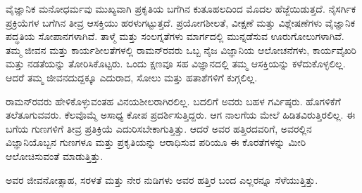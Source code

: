 ವೈಜ್ಞಾನಿಕ ಮನೋಧರ್ಮವು ಮುಖ್ಯವಾಗಿ ಪ್ರಕೃತಿಯ ಬಗೆಗಿನ ಕುತೂಹಲದಿಂದ ಮೊದಲ ಹೆಜ್ಜೆಯಿಡುತ್ತದೆ. ನೈಸರ್ಗಿಕ ಪ್ರಕ್ರಿಯೆಗಳ ಬಗೆಗಿನ ತೀವ್ರ ಆಸಕ್ತಿಯು ಹರಳುಗಟ್ಟುತ್ತದೆ. ಪ್ರಯೋಗ\-ಶೀಲತೆ, ವೀಕ್ಷಣೆ ಮತ್ತು ವಿಶ್ಲೇಷಣೆಗಳು ವೈಜ್ಞಾನಿಕ ಪದ್ಧತಿಯ ಸೋಪಾನಗಳಾಗಿವೆ. ತಾಳ್ಮೆ ಮತ್ತು ಸಂಲಗ್ನತೆಗಳು ಮಾರ್ಗದಲ್ಲಿ ಮುನ್ನಡೆಸುವ ಊರುಗೋಲುಗಳಾಗಿವೆ. ತಮ್ಮ ಜೀವನ ಮತ್ತು ಕಾರ್ಯಶೀಲತೆಗಳಲ್ಲಿ ರಾಮನ್‍ರವರು ಒಬ್ಬ ನೈಜ ವಿಜ್ಞಾನಿಯ ಆಲೋಚನೆಗಳು, ಕಾರ್ಯವೈಖರಿ ಮತ್ತು ನಡತೆಯನ್ನು ತೋರಿಸಿಕೊಟ್ಟರು. ಒಂದು ಕ್ಷಣವೂ ಸಹ ವಿಜ್ಞಾನದಲ್ಲಿ ತಮ್ಮ ಆಸಕ್ತಿಯನ್ನು ಕಳೆದುಕೊಳ್ಳಲಿಲ್ಲ. ಆದರೆ ತಮ್ಮ ಜೀವನದುದ್ದಕ್ಕೂ ಎದುರಾದ, ಸೋಲು ಮತ್ತು ಹತಾಶೆಗಳಿಗೆ ಕುಗ್ಗಲಿಲ್ಲ.

ರಾಮನ್‍ರವರು ಹೇಳಿಕೊಳ್ಳುವಂತಹ ವಿನಯಶೀಲರಾಗಿರಲಿಲ್ಲ. ಬದಲಿಗೆ ಅವರು ಬಹಳ ಗರ್ವಿಷ್ಠರು. ಹೊಗಳಿಕೆಗೆ ತಲೆತೂಗುವವರು. ಕೆಲವೊಮ್ಮೆ ಅಸಾಧ್ಯ ಕೋಪ ಪ್ರದರ್ಶಿಸುತ್ತಿದ್ದರು. ಆಗ ನಾಲಗೆಯ ಮೇಲೆ ಹಿಡಿತವಿರುತ್ತಿರಲಿಲ್ಲ. ಈ ಬಗೆಯ ಗುಣಗಳಿಗೆ ತೀವ್ರ ಪ್ರತಿಕ್ರಿಯೆ ಎದುರಿಸಬೇಕಾಗುತ್ತಿತ್ತು. ಆದರೆ ಅವರ ಹತ್ತಿರದವರಿಗೆ, ಅವರಲ್ಲಿನ ವಿಜ್ಞಾನಿಯೊಬ್ಬನ ಗುಣಗಳೂ ಮತ್ತು ಪ್ರಕೃತಿಯನ್ನು ಆರಾಧಿಸುವ ಪರಿಯೂ ಈ ಕೊರತೆಗಳನ್ನು ಮೀರಿ ಆಲೋಚಿಸುವಂತೆ ಮಾಡುತ್ತಿತ್ತು.

ಅವರ ಜೀವನೋತ್ಸಾಹ, ಸರಳತೆ ಮತ್ತು ನೇರ ನುಡಿಗಳು ಅವರ ಹತ್ತಿರ ಬಂದ ಎಲ್ಲರನ್ನೂ ಸೆಳೆಯುತ್ತಿತ್ತು.

\newpage


